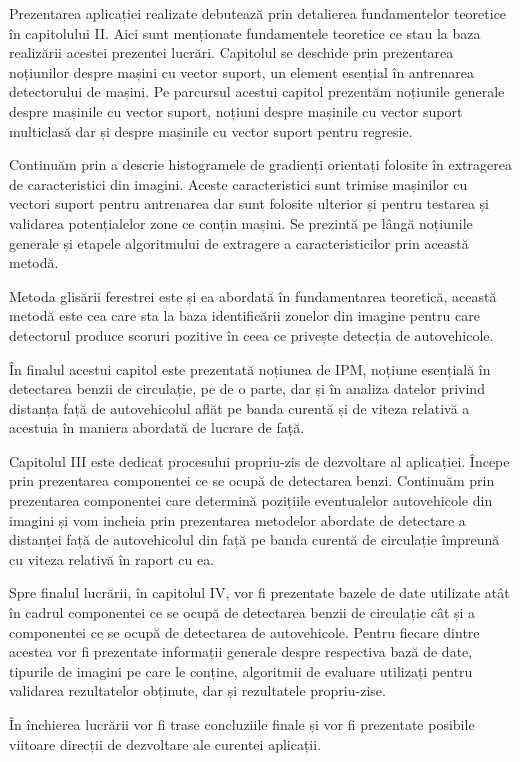 Prezentarea aplicației realizate debutează prin detalierea fundamentelor teoretice în capitolului II. Aici sunt menționate fundamentele teoretice ce stau la baza realizării acestei prezentei lucrări. 
Capitolul se deschide prin prezentarea noțiunilor despre mașini cu vector suport, un element esențial în antrenarea detectorului de mașini. Pe parcursul acestui capitol prezentăm noțiunile generale despre mașinile cu vector suport, noțiuni despre mașinile cu vector suport multiclasă dar și despre mașinile cu vector suport pentru regresie.

Continuăm prin a descrie histogramele de gradienți orientați folosite în extragerea de caracteristici din imagini. Aceste caracteristici sunt trimise mașinilor cu vectori suport pentru antrenarea dar sunt folosite ulterior și pentru testarea și validarea potențialelor zone ce conțin mașini. 
Se prezintă pe lângă noțiunile generale și etapele algoritmului de extragere a caracteristicilor prin această metodă. 

Metoda glisării ferestrei este și ea abordată în fundamentarea teoretică, această metodă este cea care sta la baza identificării zonelor din imagine pentru care detectorul produce scoruri pozitive în ceea ce privește detecția de autovehicole.

În finalul acestui capitol este prezentată noțiunea de IPM, noțiune esențială în detectarea benzii de circulație, pe de o parte, dar și în analiza datelor privind distanța față de autovehicolul aflăt pe banda curentă și de viteza relativă a acestuia în maniera abordată de lucrare de față.

Capitolul III este dedicat procesului propriu-zis de dezvoltare al aplicației. Începe prin prezentarea componentei ce se ocupă de detectarea benzi. Continuăm prin prezentarea componentei care determină pozițiile eventualelor autovehicole din imagini și vom incheia prin prezentarea metodelor abordate de detectare a distanței față de autovehicolul din față pe banda curentă de circulație împreună cu viteza relativă în raport cu ea.

Spre finalul lucrării, în capitolul IV, vor fi prezentate bazele de date utilizate atât în cadrul componentei ce se ocupă de detectarea benzii de circulație cât și a componentei ce se ocupă de detectarea de autovehicole. Pentru fiecare dintre acestea vor fi prezentate informații generale despre respectiva bază de date, tipurile de imagini pe care le conține, algoritmii de evaluare utilizați pentru validarea rezultatelor obținute, dar și rezultatele propriu-zise.

În închierea lucrării vor fi trase concluziile finale și vor fi prezentate posibile viitoare direcții de dezvoltare ale curentei aplicații.